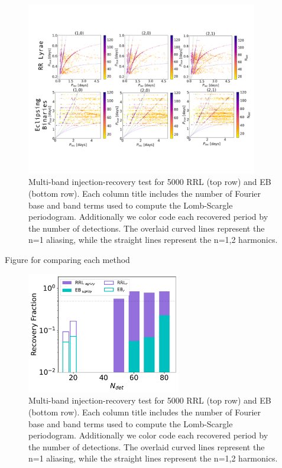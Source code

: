 \documentclass[DM,authoryear,toc]{lsstdoc}
\begin{document}
\begin{figure}
  \includegraphics[width=0.9\textwidth]{figures/multi_lsp_rectest.pdf}
  \centering 
  \caption{Multi-band injection-recovery test for 5000 RRL (top row) and EB (bottom row). Each column title includes the number of Fourier base and band terms used to compute the Lomb-Scargle periodogram. Additionally we color code each recovered period by the number of detections. The overlaid curved lines represent the n=1 aliasing, while the straight lines represent the n=1,2 harmonics.}
\end{figure}

Figure for comparing each method

\begin{figure}
  \includegraphics[width=0.6\textwidth]{figures/multi_vs_single_rec_frac.pdf}
  \centering 
  \caption{Multi-band injection-recovery test for 5000 RRL (top row) and EB (bottom row). Each column title includes the number of Fourier base and band terms used to compute the Lomb-Scargle periodogram. Additionally we color code each recovered period by the number of detections. The overlaid curved lines represent the n=1 aliasing, while the straight lines represent the n=1,2 harmonics.}
\end{figure}
\end{document}
